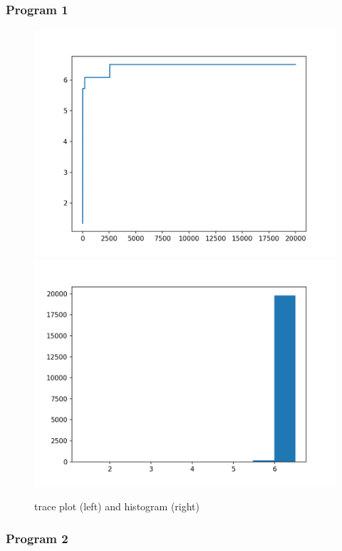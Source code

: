 \documentclass[12pt]{article}%
\theoremstyle{definition}
\begin{document}
	\newpage
	
	\subsubsection{Program 1}
	
	\begin{figure}[h]
	\centering
	\includegraphics[scale=0.4]{p1traceplot.png}
	\includegraphics[scale=0.4]{p1histogram.png}
	\caption{trace plot (left) and histogram (right)}
	\end{figure}


	\subsubsection{Program 2}
	
\end{document}
